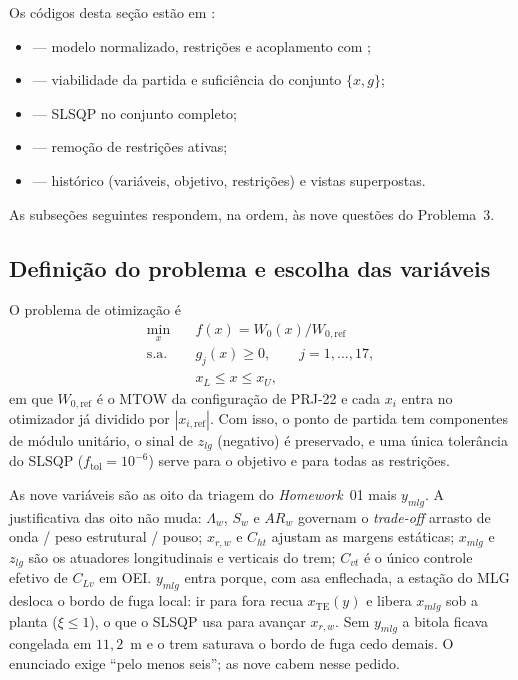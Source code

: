 Os códigos desta seção estão em :
\begin{itemize}
\item {} --- modelo normalizado, restrições e
      acoplamento com ;
\item {} --- viabilidade da partida e
      suficiência do conjunto $\{x,g\}$;
\item {} --- SLSQP no conjunto completo;
\item {} --- remoção de restrições
      ativas;
\item {} --- histórico (variáveis, objetivo,
      restrições) e vistas superpostas.
\end{itemize}

As subseções seguintes respondem, na ordem, às nove questões do
Problema~3.

\subsection{Definição do problema e escolha das variáveis}
\label{sec:p3q1}

O problema de otimização é
\begin{equation}
\begin{aligned}
\min_{x}\quad
& f(x) = W_0(x)/W_{0,\mathrm{ref}} \\
\text{s.a.}\quad
& g_j(x) \ge 0, \qquad j=1,\ldots,17, \\
& x_L \le x \le x_U,
\end{aligned}
\label{eq:nlp}
\end{equation}
em que $W_{0,\mathrm{ref}}$ é o MTOW da configuração de PRJ-22 e cada
$x_i$ entra no otimizador já dividido por $|x_{i,\mathrm{ref}}|$. Com isso,
o ponto de partida tem componentes de módulo unitário, o sinal de
$z_{lg}$ (negativo) é preservado, e uma única tolerância do SLSQP
($f_{\mathrm{tol}}=10^{-6}$) serve para o objetivo e para todas as
restrições.

As nove variáveis são as oito da triagem do \emph{Homework}~01 mais
$y_{mlg}$. A justificativa das oito não muda: $\Lambda_w$,
$S_w$ e $AR_w$ governam o \emph{trade-off} arrasto de onda / peso estrutural
/ pouso; $x_{r,w}$ e $C_{ht}$ ajustam as margens estáticas; $x_{mlg}$ e
$z_{lg}$ são os atuadores longitudinais e verticais do trem; $C_{vt}$ é
o único controle efetivo de $C_{Lv}$ em OEI. $y_{mlg}$ entra porque, com
asa enflechada, a estação do MLG desloca o bordo de fuga local: ir
para fora recua $x_{\mathrm{TE}}(y)$ e libera $x_{mlg}$ sob a planta
($\xi\le 1$), o que o SLSQP usa para avançar $x_{r,w}$. Sem $y_{mlg}$
a bitola ficava congelada em $11{,}2$~m e o trem saturava o bordo de fuga
cedo demais. O enunciado exige ``pelo menos seis''; as nove cabem nesse
pedido.

